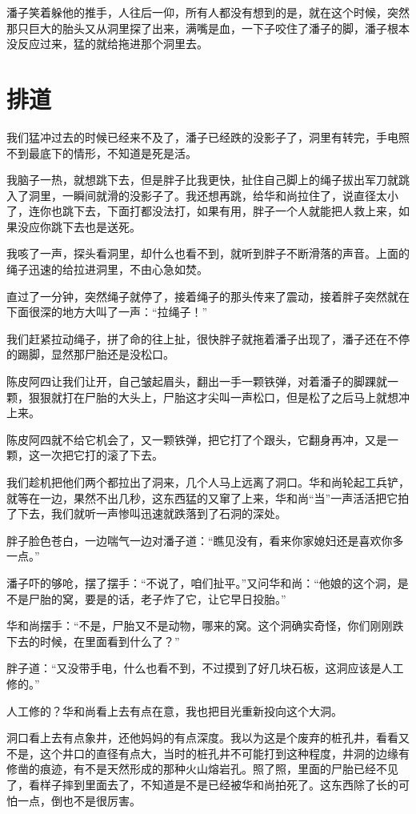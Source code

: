 潘子笑着躲他的推手，人往后一仰，所有人都没有想到的是，就在这个时候，突然那只巨大的胎头又从洞里探了出来，满嘴是血，一下子咬住了潘子的脚，潘子根本没反应过来，猛的就给拖进那个洞里去。

\chapter{排道}

我们猛冲过去的时候已经来不及了，潘子已经跌的没影子了，洞里有转完，手电照不到最底下的情形，不知道是死是活。

我脑子一热，就想跳下去，但是胖子比我更快，扯住自己脚上的绳子拔出军刀就跳入了洞里，一瞬间就滑的没影子了。我还想再跳，给华和尚拉住了，说直径太小了，连你也跳下去，下面打都没法打，如果有用，胖子一个人就能把人救上来，如果没应你跳下去也是送死。

我咳了一声，探头看洞里，却什么也看不到，就听到胖子不断滑落的声音。上面的绳子迅速的给拉进洞里，不由心急如焚。

直过了一分钟，突然绳子就停了，接着绳子的那头传来了震动，接着胖子突然就在下面很深的地方大叫了一声：“拉绳子！”

我们赶紧拉动绳子，拼了命的往上扯，很快胖子就拖着潘子出现了，潘子还在不停的踢脚，显然那尸胎还是没松口。

陈皮阿四让我们让开，自己皱起眉头，翻出一手一颗铁弹，对着潘子的脚踝就一颗，狠狠就打在尸胎的大头上，尸胎这才尖叫一声松口，但是松了之后马上就想冲上来。

陈皮阿四就不给它机会了，又一颗铁弹，把它打了个跟头，它翻身再冲，又是一颗，这一次把它打的滚了下去。

我们趁机把他们两个都拉出了洞来，几个人马上远离了洞口。华和尚轮起工兵铲，就等在一边，果然不出几秒，这东西猛的又窜了上来，华和尚“当”一声活活把它拍了下去，我们就听一声惨叫迅速就跌落到了石洞的深处。

胖子脸色苍白，一边喘气一边对潘子道：“瞧见没有，看来你家媳妇还是喜欢你多一点。”

潘子吓的够呛，摆了摆手：“不说了，咱们扯平。”又问华和尚：“他娘的这个洞，是不是尸胎的窝，要是的话，老子炸了它，让它早日投胎。”

华和尚摆手：“不是，尸胎又不是动物，哪来的窝。这个洞确实奇怪，你们刚刚跌下去的时候，在里面看到什么了？”

胖子道：“又没带手电，什么也看不到，不过摸到了好几块石板，这洞应该是人工修的。”

人工修的？华和尚看上去有点在意，我也把目光重新投向这个大洞。

洞口看上去有点象井，还他妈妈的有点深度。我以为这是个废弃的桩孔井，看看又不是，这个井口的直径有点大，当时的桩孔井不可能打到这种程度，井洞的边缘有修凿的痕迹，有不是天然形成的那种火山熔岩孔。照了照，里面的尸胎已经不见了，看样子摔到里面去了，不知道是不是已经被华和尚拍死了。这东西除了长的可怕一点，倒也不是很厉害。


